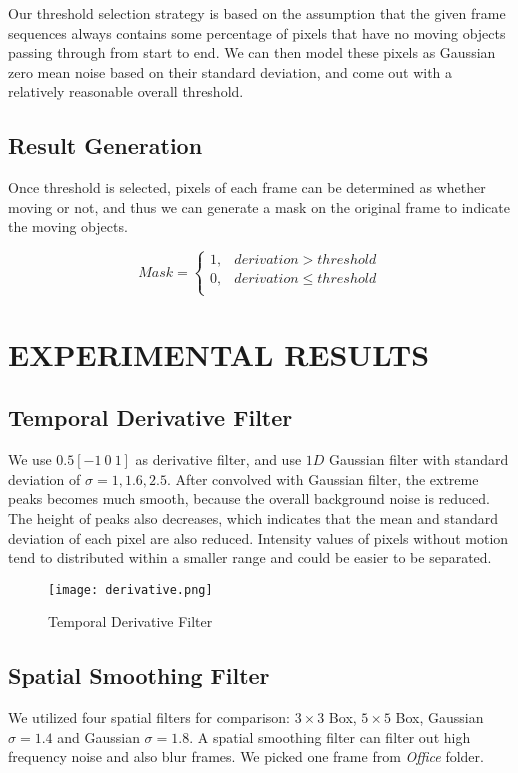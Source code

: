 \documentclass[letterpaper, 10 pt, conference]{ieeeconf}
\begin{document}
Our threshold selection strategy is based on the assumption that the given frame sequences always contains some percentage of pixels that have no moving objects passing through from start to end. We can then model these pixels as Gaussian zero mean noise based on their standard deviation, and come out with a relatively reasonable overall threshold. 

\subsection{Result Generation}
Once threshold is selected, pixels of each frame can be determined as whether moving or not, and thus we can generate a mask on the original frame to indicate the moving objects.

\begin{equation}  
Mask = \left\{  
     \begin{array}{cc}  
     1, & derivation > threshold\\  
     0, & derivation \leq threshold\\   
     \end{array}  
\right.  
\end{equation}  

\section{EXPERIMENTAL RESULTS}
\subsection{Temporal Derivative Filter}
We use $0.5[-1\ 0\ 1]$ as derivative filter, and use $1D$ Gaussian filter with standard deviation of $\sigma=1, 1.6, 2.5$. After convolved with Gaussian filter, the extreme peaks becomes much smooth, because the overall background noise is reduced. The height of peaks also decreases, which indicates that the mean and standard deviation of each pixel are also reduced. Intensity values of pixels without motion tend to distributed within a smaller range and could be easier to be separated.

\begin{figure}[thpb]
\centering
\texttt{[image: derivative.png]}
\caption{Temporal Derivative Filter}
\label{der} 
\end{figure}

\subsection{Spatial Smoothing Filter}
We utilized four spatial filters for comparison: $3\times3$ Box, $5\times5$ Box, Gaussian $\sigma = 1.4$ and Gaussian $\sigma = 1.8$. A spatial smoothing filter can filter out high frequency noise and also blur frames. We picked one frame from \textit{Office} folder. 
\end{document}
